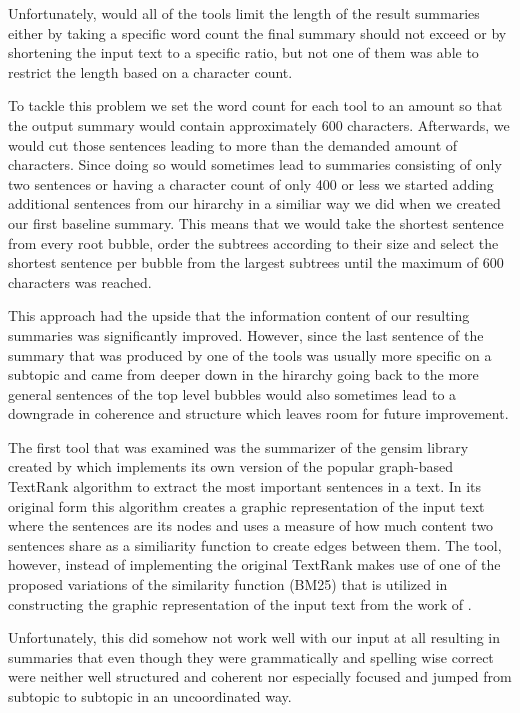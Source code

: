 Unfortunately, would all of the tools limit the length of the result summaries either by taking a specific word count the final summary should not exceed or by shortening the input text to a specific ratio, but not one of them was able to restrict the length based on a character count. 

To tackle this problem we set the word count for each tool to an amount so that the output summary would contain approximately 600 characters. Afterwards, we would cut those sentences leading to more than the demanded amount of characters. Since doing so would sometimes lead to summaries consisting of only two sentences or having a character count of only 400 or less we started adding additional sentences from our hirarchy in a similiar way we did when we created our first baseline summary. This means that we would take the shortest sentence from every root bubble, order the subtrees according to their size and select the shortest sentence per bubble from the largest subtrees until the maximum of 600 characters was reached.

This approach had the upside that the information content of our resulting summaries was significantly improved. However, since the last sentence of the summary that was produced by one of the tools was usually more specific on a subtopic and came from deeper down in the hirarchy going back to the more general sentences of the top level bubbles would also sometimes lead to a downgrade in coherence and structure which leaves room for future improvement.  

The first tool that was examined was the summarizer of the gensim library created by \citet{rehurek_lrec} which implements its own version of the popular graph-based TextRank algorithm to extract the most important sentences in a text. In its original form this algorithm creates a graphic representation of the input text where the sentences are its nodes and uses a measure of how much content two sentences share as a similiarity function to create edges between them. The tool, however, instead of implementing the original TextRank makes use of one of the proposed variations of the similarity function (BM25) that is utilized in constructing the graphic representation of the input text from the work of \citet{DBLP:journals/corr/BarriosLAW16}. 

Unfortunately, this did somehow not work well with our input at all resulting in summaries that even though they were grammatically and spelling wise correct were neither well structured and coherent nor especially focused and jumped from subtopic to subtopic in an uncoordinated way.  

